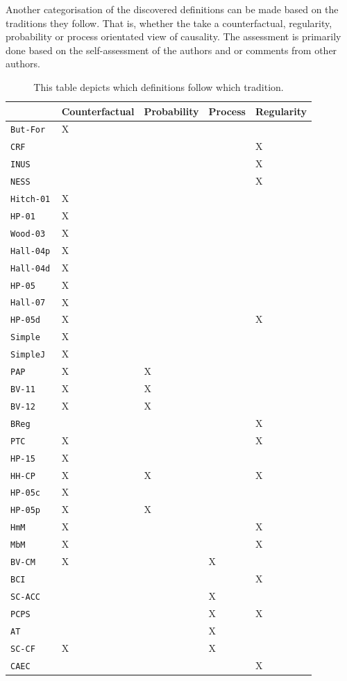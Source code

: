 \documentclass[11pt,a4paper]{book}
\theoremstyle{definition}
\theoremstyle{definition}
\theoremstyle{definition}
\theoremstyle{remark}
\newcommand{\butfor}{\texttt{But-For}\,}
\newcommand{\crf}{\texttt{CRF}\,}
\newcommand{\inus}{\texttt{INUS}\,}
\newcommand{\ness}{\texttt{NESS}\,}
\newcommand{\hitch}{\texttt{Hitch-01}\,}
\newcommand{\hpo}{\texttt{HP-01}\,}
\newcommand{\wood}{\texttt{Wood-03}\,}
\newcommand{\hallp}{\texttt{Hall-04p}\,}
\newcommand{\halld}{\texttt{Hall-04d}\,}
\newcommand{\hpu}{\texttt{HP-05}\,}
\newcommand{\hall}{\texttt{Hall-07}\,}
\newcommand{\hpud}{\texttt{HP-05d}\,}
\newcommand{\simple}{\texttt{Simple}\,}
\newcommand{\simplej}{\texttt{SimpleJ}\,}
\newcommand{\pap}{\texttt{PAP}\,}
\newcommand{\bvo}{\texttt{BV-11}\,}
\newcommand{\bvu}{\texttt{BV-12}\,}
\newcommand{\breg}{\texttt{BReg}\,}
\newcommand{\ptc}{\texttt{PTC}\,}
\newcommand{\hpm}{\texttt{HP-15}\,}
\newcommand{\hhcp}{\texttt{HH-CP}\,}
\newcommand{\hpuc}{\texttt{HP-05c}\,}
\newcommand{\hpup}{\texttt{HP-05p}\,}
\newcommand{\hmm}{\texttt{HmM}\,}
\newcommand{\mbm}{\texttt{MbM}\,}
\newcommand{\bvcm}{\texttt{BV-CM}\,}
\newcommand{\bci}{\texttt{BCI}\,}
\newcommand{\scacc}{\texttt{SC-ACC}\,}
\newcommand{\pcps}{\texttt{PCPS}\,}
\newcommand{\at}{\texttt{AT}\,}
\newcommand{\sccf}{\texttt{SC-CF}\,}
\newcommand{\caec}{\texttt{CAEC}\,}
\begin{document}
Another categorisation of the discovered definitions can be made based on the traditions they follow. That is, whether the take a counterfactual, regularity, probability or process orientated view of causality.
The assessment is primarily done based on the self-assessment of the authors and or comments from other authors.





\begin{table}
\centering
\scriptsize
\begin{tabular}{lllll}
\toprule
	 & Counterfactual	 & Probability	 & Process	 & Regularity	\\
	 \midrule
\butfor	& X	& 	& 	& 	\\
\crf	& 	& 	& 	& X	\\
\inus	& 	& 	& 	& X	\\
\ness	& 	& 	& 	& X	\\
\hitch	& X	& 	& 	& 	\\
\hpo	& X	& 	& 	& 	\\
\wood	& X	& 	& 	& 	\\
\hallp	& X	& 	& 	& 	\\
\halld	& X	& 	& 	& 	\\
\hpu	& X	& 	& 	& 	\\
\hall	& X	& 	& 	& 	\\
\hpud	& X	& 	& 	& X	\\
\simple	& X	& 	& 	& 	\\
\simplej	& X	& 	& 	& 	\\
\pap	& X	& X	& 	& 	\\
\bvo	& X	& X	& 	& 	\\
\bvu	& X	& X	& 	& 	\\
\breg	& 	& 	& 	& X	\\
\ptc	& X	& 	& 	& X	\\
\hpm	& X	& 	& 	& 	\\
\hhcp	& X	& X	& 	& X	\\
\hpuc	& X	& 	& 	& 	\\
\hpup	& X	& X	& 	& 	\\
\hmm	& X	& 	& 	& X	\\
\mbm	& X	& 	& 	& X	\\
\bvcm	& X	& 	& X	& 	\\
\bci	& 	& 	& 	& X	\\
\scacc	& 	& 	& X	& 	\\
\pcps	& 	& 	& X	& X	\\
\at	& 	& 	& X	& 	\\
\sccf	& X	& 	& X	& 	\\
\caec	& 	& 	& 	& X	\\

\bottomrule
\end{tabular}
\caption{This table depicts which definitions follow which tradition.}
\label{tab:definition_traditions}
\end{table}
\end{document}
